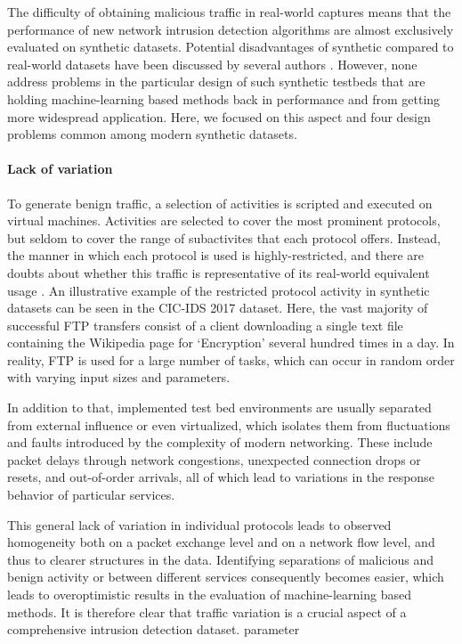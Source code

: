The difficulty of obtaining malicious traffic in real-world captures means that the performance of new network intrusion detection algorithms are almost exclusively evaluated on synthetic datasets. Potential disadvantages of synthetic compared to real-world datasets have been discussed by several authors \cite{sommer2010outside,sperotto2009labeled}. However, none address problems in the particular design of such synthetic testbeds that are holding machine-learning based methods back in performance and from getting more widespread application. Here, we focused on this aspect and four design problems common among modern synthetic datasets.


\paragraph{Lack of variation}\label{Sec:lackvar}

To generate benign traffic, a selection of activities is scripted and executed on virtual machines. Activities are selected to cover the most prominent protocols, but seldom to cover the range of subactivites that each protocol offers. Instead, the manner in which each protocol is used is highly-restricted, and there are doubts about whether this traffic is representative of its real-world equivalent usage \cite{sommer2010outside}. 
An illustrative example of the restricted protocol activity in synthetic datasets can be seen in the CIC-IDS 2017 dataset. Here, the vast majority of successful FTP transfers consist of a client downloading a single text file containing the Wikipedia page for `Encryption' several hundred times in a day. In reality, FTP is used for a large number of tasks, which can occur in random order with varying input sizes and parameters. 

In addition to that, implemented test bed environments are usually separated from external influence or even virtualized, which isolates them from fluctuations and faults introduced by the complexity of modern networking. These include packet delays through network congestions, unexpected connection drops or resets, and out-of-order arrivals, all of which lead to variations in the response behavior of particular services.

This general lack of variation in individual protocols leads to observed homogeneity both on a packet exchange level and on a network flow level, and thus to clearer structures in the data. Identifying separations of malicious and benign activity or between different services consequently becomes easier, which leads to overoptimistic results in the evaluation of machine-learning based methods. It is therefore clear that traffic variation is a crucial aspect of a comprehensive intrusion detection dataset.
parameter

